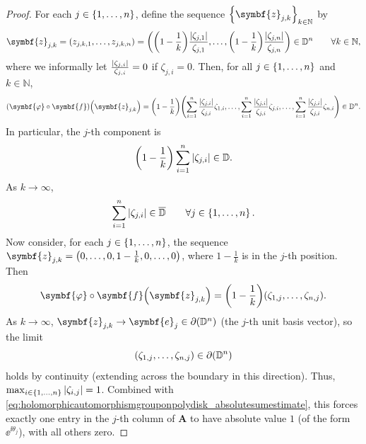 \begin{proof}
    For each \(j\in\cbraces{1,\ldots,n}\), define the sequence \(\cbraces{\symbf{z}_{j,k}}_{k\in\mathbb{N}}\) by
    \[\symbf{z}_{j,k}=\qty(z_{j,k,1},\dots,z_{j,k,n})=\qty(\qty(1-\frac{1}{k})\frac{\abs{\zeta_{j,1}}}{\zeta_{j,1}},\dots,\qty(1-\frac{1}{k})\frac{\abs{\zeta_{j,n}}}{\zeta_{j,n}})\in\mathbb{D}^n\qquad\forall k\in\mathbb{N},\]
    where we informally let \(\frac{\abs{\zeta_{j,i}}}{\zeta_{j,i}}=0\) if \(\zeta_{j,i}=0\). Then, for all \(j\in\cbraces{1,\ldots,n}\) and \(k\in\mathbb{N}\),
    \[\qty(\symbf{\varphi}\circ\symbf{f})\qty(\symbf{z}_{j,k})=\qty(1-\frac{1}{k})\qty(\sum_{i=1}^n\frac{\abs{\zeta_{j,i}}}{\zeta_{j,i}}\zeta_{1,i},\dots,\sum_{i=1}^n\frac{\abs{\zeta_{j,i}}}{\zeta_{j,i}}\zeta_{j,i},\dots,\sum_{i=1}^n\frac{\abs{\zeta_{j,i}}}{\zeta_{j,i}}\zeta_{n,i})\in\mathbb{D}^n.\]
    In particular, the \(j\)-th component is
    \[\qty(1-\frac{1}{k})\sum_{i=1}^n\abs{\zeta_{j,i}}\in\mathbb{D}.\]
    As \(k\to\infty\),
    \begin{equation}
        \sum_{i=1}^n\abs{\zeta_{j,i}}\in\overline{\mathbb{D}}\qquad\forall j\in\cbraces{1,\ldots,n}.\label{eq:holomorphicautomorphismgrouponpolydisk_absolutesumestimate}
    \end{equation}
    Now consider, for each \(j\in\cbraces{1,\ldots,n}\), the sequence \(\symbf{z}_{j,k}=\qty(0,\ldots,0,1-\frac{1}{k},0,\ldots,0)\), where \(1-\frac{1}{k}\) is in the \(j\)-th position. Then
    \[\symbf{\varphi}\circ\symbf{f}\qty(\symbf{z}_{j,k})=\qty(1-\frac{1}{k})\qty(\zeta_{1,j},\ldots,\zeta_{n,j}).\]
    As \(k\to\infty\), \(\symbf{z}_{j,k}\to\symbf{e}_j\in\partial\qty(\mathbb{D}^n)\) (the \(j\)-th unit basis vector), so the limit
    \[\qty(\zeta_{1,j},\ldots,\zeta_{n,j})\in\partial\qty(\mathbb{D}^n)\]
    holds by continuity (extending across the boundary in this direction). Thus, \(\max_{i\in\cbraces{1,\ldots,n}}\abs{\zeta_{i,j}}=1\). Combined with \cref{eq:holomorphicautomorphismgrouponpolydisk_absolutesumestimate}, this forces exactly one entry in the \(j\)-th column of \(\symbf{A}\) to have absolute value \(1\) (of the form \(\ee^{\ii\theta_j}\)), with all others zero.


\end{proof}
